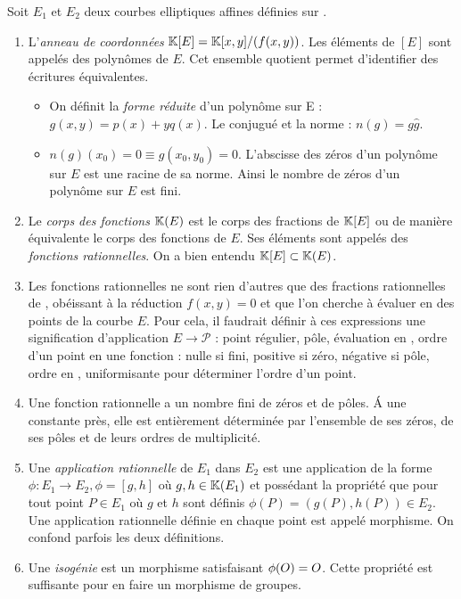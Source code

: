 Soit $E_1$ et $E_2$ deux courbes elliptiques affines définies sur \field{}. 
\begin{enumerate}
    \item L'\emph{anneau de coordonnées} $\mathbb{K}{}[E] = \mathbb{K}{}[x,y]/(f(x,y))$. Les éléments de \closure{}$[E]$ sont appelés des polynômes de $E$. Cet ensemble quotient permet d'identifier des écritures équivalentes.
        \begin{itemize}[label=--]
            \item On définit la  \emph{forme réduite} d'un polynôme sur E : $g(x, y) = p(x) + yq(x)$. Le conjugué et la norme : $n(g) = g \hat{g}$.
            \item $n(g)(x_0) = 0 \equiv g(x_0, y_0) = 0$. L'abscisse des zéros d'un polynôme sur $E$ est une racine de sa norme. Ainsi le nombre de zéros d'un polynôme sur $E$ est fini. 
        \end{itemize}
    \item Le \emph{corps des fonctions} $\mathbb{K}{}(E)$ est le corps des fractions de $\mathbb{K}{}[E]$ ou de manière équivalente le corps des fonctions de $E$. Ses éléments sont appelés des \emph{fonctions rationnelles}. On a bien entendu $\mathbb{K}{}[E] \subset \mathbb{K}{}(E)$.
    \item Les fonctions rationnelles ne sont rien d'autres que des fractions rationnelles de \field{}, obéissant à la réduction $f(x, y) = 0$ et que l'on cherche à évaluer en des points de la courbe $E$. Pour cela, il faudrait définir à ces expressions une signification d'application $E \to \mathcal{P}$ : point régulier, pôle, évaluation en \infini{}, ordre d'un point en une fonction : nulle si fini, positive si zéro, négative si pôle, ordre en \infini{}, uniformisante pour déterminer l'ordre d'un point.
    \item Une fonction rationnelle a un nombre fini de zéros et de pôles. \'A une constante près, elle est entièrement déterminée par l'ensemble de ses zéros, de ses pôles et de leurs ordres de multiplicité.
    \item Une \emph{application rationnelle} de $E_1$ dans $E_2$ est une application de la forme $\phi \colon E_1 \to E_2, \phi = [g, h]$ où $g, h \in \mathbb{K}{}(E_1)$ et possédant la propriété que pour tout point $P \in E_1$ où $g$ et $h$ sont définis $\phi(P) = (g(P), h(P)) \in E_2$.\\
    Une application rationnelle définie en chaque point est appelé morphisme. On confond parfois les deux définitions.
    \item Une \emph{isogénie} est un morphisme satisfaisant $\phi(O{}) = O{}$. Cette propriété est suffisante pour en faire un morphisme de groupes.

\end{enumerate}
